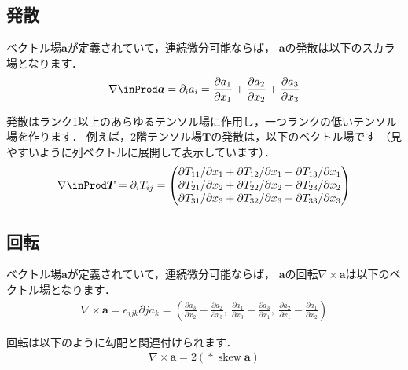 \subsection{発散}
\label{ssec:2.1.2}
ベクトル場$\bm{a}$が定義されていて，連続微分可能ならば，
$\bm{a}$の発散は以下のスカラ場となります．
\begin{align}
 \label{eq:2.4}
 \nabla \inProd \bm{a} = \partial_{i}a_{i}
 = \frac{\partial a_{1}}{\partial x_{1}}
 + \frac{\partial a_{2}}{\partial x_{2}}
 + \frac{\partial a_{3}}{\partial x_{3}}
\end{align}

発散はランク1以上のあらゆるテンソル場に作用し，一つランクの低いテンソル場を作ります．
例えば，2階テンソル場$\bm{T}$の発散は，以下のベクトル場です
（見やすいように列ベクトルに展開して表示しています）．
\begin{align}
 \label{eq:2.5}
 \nabla \inProd \bm{T} = \partial_{i}T_{ij} =
 \begin{pmatrix}
  \partial T_{11}/\partial x_{1} + \partial T_{12}/\partial x_{1} + \partial T_{13}/\partial x_{1} \\
  \partial T_{21}/\partial x_{2} + \partial T_{22}/\partial x_{2} + \partial T_{23}/\partial x_{2} \\
  \partial T_{31}/\partial x_{3} + \partial T_{32}/\partial x_{3} + \partial T_{33}/\partial x_{3} \\
 \end{pmatrix}
\end{align}


\subsection{回転}
\label{ssec:2.1.3}
ベクトル場$\bm{a}$が定義されていて，連続微分可能ならば，
$\bm{a}$の回転$\nabla \times \bm{a}$は以下のベクトル場となります．
\begin{align}
 \label{eq:2.6}
 \nabla \times \bm{a} = e_{ijk}\partial{j}a_{k}
 = \left(\frac{\partial a_{3}}{\partial x_{2}} - \frac{\partial a_{2}}{\partial x_{3}},\
 \frac{\partial a_{1}}{\partial x_{3}} - \frac{\partial a_{3}}{\partial x_{1}},\
 \frac{\partial a_{2}}{\partial x_{1}} - \frac{\partial a_{1}}{\partial x_{2}}\right)
\end{align}

回転は以下のように勾配と関連付けられます．
\begin{align}
 \label{eq:2.7}
 \nabla \times \bm{a} = 2(\mathop{*}\mathop{\mathrm{skew}}\bm{a})
\end{align}


